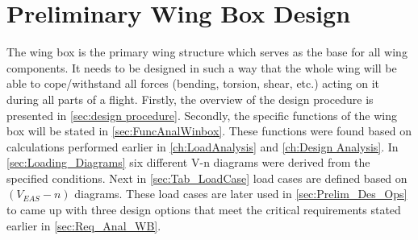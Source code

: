 \chapter{Preliminary Wing Box Design}
\label{ch:Prelim_WB_Des}
\noindent The wing box is the primary wing structure which serves as the base for all wing components. It needs to be designed in such a way that the whole wing will be able to cope/withstand all forces (bending, torsion, shear, etc.) acting on it during all parts of a flight. Firstly, the overview of the design procedure is presented in \autoref{sec:design procedure}. Secondly, the specific functions of the wing box will be stated in \autoref{sec:FuncAnalWinbox}. These functions were found based on calculations performed earlier in \autoref{ch:LoadAnalysis} and 
\autoref{ch:Design Analysis}. In \autoref{sec:Loading_Diagrams} six different V-n diagrams were derived from the specified conditions. Next in \autoref{sec:Tab_LoadCase} load cases are defined based on $\left(V_{EAS}-n\right)$ diagrams. These load cases are later used in \autoref{sec:Prelim_Des_Ops} to came up with three design options that meet the critical requirements stated earlier in \autoref{sec:Req_Anal_WB}.

